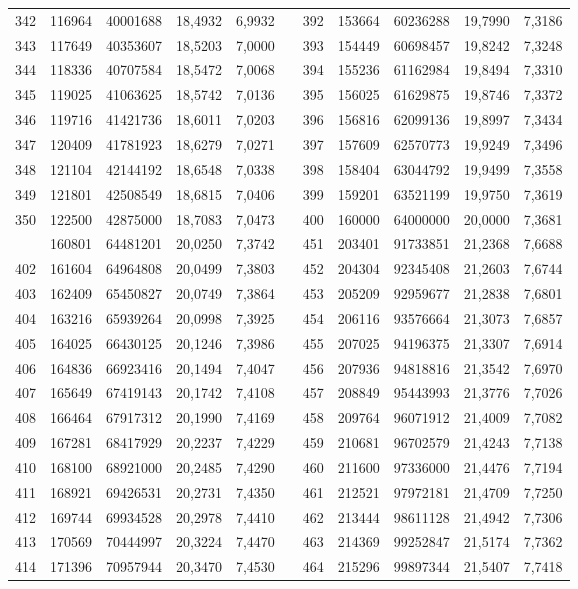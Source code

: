 \begin{longtable}{rrrrrrrrrrr}
342&116964&40001688&18,4932&6,9932&&392&153664&60236288&19,7990&7,3186\\
343&117649&40353607&18,5203&7,0000&&393&154449&60698457&19,8242&7,3248\\
344&118336&40707584&18,5472&7,0068&&394&155236&61162984&19,8494&7,3310\\
345&119025&41063625&18,5742&7,0136&&395&156025&61629875&19,8746&7,3372\\
346&119716&41421736&18,6011&7,0203&&396&156816&62099136&19,8997&7,3434\\
347&120409&41781923&18,6279&7,0271&&397&157609&62570773&19,9249&7,3496\\
348&121104&42144192&18,6548&7,0338&&398&158404&63044792&19,9499&7,3558\\
349&121801&42508549&18,6815&7,0406&&399&159201&63521199&19,9750&7,3619\\
350&122500&42875000&18,7083&7,0473&&400&160000&64000000&20,0000&7,3681\\
\newpage
401&160801&64481201&20,0250&7,3742&&451&203401&91733851&21,2368&7,6688\\
402&161604&64964808&20,0499&7,3803&&452&204304&92345408&21,2603&7,6744\\
403&162409&65450827&20,0749&7,3864&&453&205209&92959677&21,2838&7,6801\\
404&163216&65939264&20,0998&7,3925&&454&206116&93576664&21,3073&7,6857\\
405&164025&66430125&20,1246&7,3986&&455&207025&94196375&21,3307&7,6914\\
406&164836&66923416&20,1494&7,4047&&456&207936&94818816&21,3542&7,6970\\
407&165649&67419143&20,1742&7,4108&&457&208849&95443993&21,3776&7,7026\\
408&166464&67917312&20,1990&7,4169&&458&209764&96071912&21,4009&7,7082\\
409&167281&68417929&20,2237&7,4229&&459&210681&96702579&21,4243&7,7138\\
410&168100&68921000&20,2485&7,4290&&460&211600&97336000&21,4476&7,7194\\
411&168921&69426531&20,2731&7,4350&&461&212521&97972181&21,4709&7,7250\\
412&169744&69934528&20,2978&7,4410&&462&213444&98611128&21,4942&7,7306\\
413&170569&70444997&20,3224&7,4470&&463&214369&99252847&21,5174&7,7362\\
414&171396&70957944&20,3470&7,4530&&464&215296&99897344&21,5407&7,7418\\

\end{longtable}
